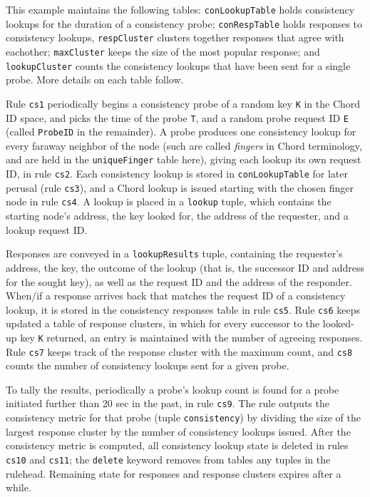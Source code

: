 \documentclass{sig-alt-full}
\newcommand{\ol}[1]{{\tt\footnotesize#1}}
\begin{document}
This example maintains the following tables:
\ol{conLookupTable} holds consistency lookups for
the duration of a consistency probe;
\ol{conRespTable} holds responses to consistency lookups,
\ol{respCluster} clusters together responses that
agree with eachother; \ol{maxCluster} keeps the
size of the most popular response; and
\ol{lookupCluster} counts the consistency lookups
that have been sent for a single probe.  More
details on each table follow.

Rule \ol{cs1} periodically begins a consistency probe of a random key \ol{K}
in the Chord ID space, and picks the time of the probe
\ol{T}, and a random probe request ID \ol{E} (called \ol{ProbeID} in the
remainder).  A probe produces one consistency lookup for
every faraway neighbor of the node (such are called
\emph{fingers} in Chord terminology, and are held in
the \ol{uniqueFinger} table here), giving each lookup its own request ID,
in rule \ol{cs2}.  Each consistency lookup is stored in 
\ol{conLookupTable} for later perusal (rule \ol{cs3}), and a Chord
lookup is issued starting with the chosen finger node in rule \ol{cs4}.
A lookup is placed in a \ol{lookup} tuple, which
contains the starting node's address, the key looked
for, the address of the requester, and a lookup
request ID.

Responses are conveyed in a \ol{lookupResults} tuple,
containing the requester's address, the key, the
outcome of the lookup (that is, the successor ID and
address for the sought key), as well as the request ID
and the address of the responder.
When/if a response arrives back that matches the
request ID of a consistency lookup, it is stored in
the consistency responses table in rule \ol{cs5}.
Rule \ol{cs6} keeps updated a table of response
clusters, in which for every successor to the
looked-up key \ol{K} returned, an entry is maintained
with the number of agreeing responses.  Rule \ol{cs7}
keeps track of the response cluster with the maximum
count, and \ol{cs8} counts the number of consistency
lookups sent for a given probe.

To tally the results, periodically a probe's lookup
count is found for a probe initiated further
than 20 sec in the past, in rule \ol{cs9}. The rule
outputs the consistency metric for that probe (tuple \ol{consistency}) by
dividing the size of the largest response cluster by
the number of consistency lookups issued.  After the
consistency metric is computed, all consistency lookup
state is deleted in rules \ol{cs10} and \ol{cs11}; the
\ol{delete} keyword removes from tables any tuples in
the rulehead.
Remaining state for responses and response
clusters expires after a while.
\end{document}
